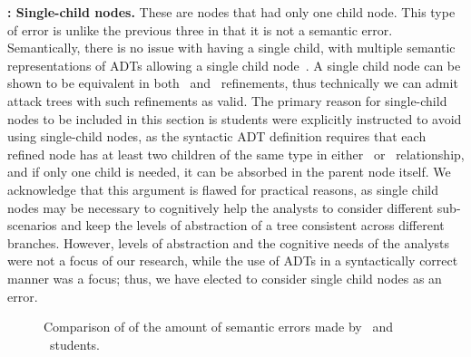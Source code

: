 \textbf{\hypothesis{\hypoSingleChildNodes}: Single-child nodes.} These are nodes that had only one child node. This type of error is unlike the previous three in that it is not a semantic error. Semantically, there is no issue with having a single child, with multiple semantic representations of ADTs allowing a single child node~\cite{mauwFoundationsAttackTrees2006,kordyFoundationsAttackDefense2011}. A single child node can be shown to be equivalent in both \AND\ and \OR\ refinements, thus technically we can admit attack trees with such refinements as valid.
The primary reason for single-child nodes to be included in this section is students were explicitly instructed to avoid using single-child nodes, as the syntactic ADT definition requires that each refined node has at least two children of the same type in either \AND\ or \OR\ relationship, and if only one child is needed, it can be absorbed in the parent node itself. We acknowledge that this argument is flawed for practical reasons, as single child nodes may be necessary to cognitively help the analysts to consider different sub-scenarios and keep the levels of abstraction of a tree consistent across different branches. However, levels of abstraction and the cognitive needs of the analysts were not a focus of our research, while the use of ADTs in a syntactically correct manner was a focus; thus, we have elected to consider single child nodes as an error.





\begin{figure}[t]
    \caption{Comparison of of the amount of semantic errors made by \ICS\ and \SEC\ students.}
    \label{fig:error-amounts}
\end{figure}

